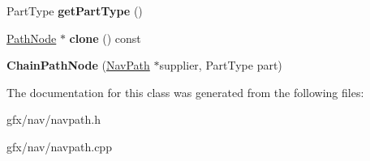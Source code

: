 \begin{DoxyCompactItemize}
\item 
Part\+Type {\bfseries get\+Part\+Type} ()\hypertarget{classChainPathNode_aa3cbfcb2f7e9ee58e584d0d31efb920d}{}\label{classChainPathNode_aa3cbfcb2f7e9ee58e584d0d31efb920d}

\item 
\hyperlink{classPathNode}{Path\+Node} $\ast$ {\bfseries clone} () const \hypertarget{classChainPathNode_afd515aaee54cac05451c1273436321e1}{}\label{classChainPathNode_afd515aaee54cac05451c1273436321e1}

\item 
{\bfseries Chain\+Path\+Node} (\hyperlink{classNavPath}{Nav\+Path} $\ast$supplier, Part\+Type part)\hypertarget{classChainPathNode_a8fcd6918f3fbbafba8c513e7efe7a654}{}\label{classChainPathNode_a8fcd6918f3fbbafba8c513e7efe7a654}

\end{DoxyCompactItemize}


The documentation for this class was generated from the following files\+:\begin{DoxyCompactItemize}
\item 
gfx/nav/navpath.\+h\item 
gfx/nav/navpath.\+cpp\end{DoxyCompactItemize}
